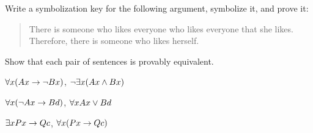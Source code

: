 \solutions
\problempart
\label{pr.likes}
Write a symbolization key for the following argument, symbolize it, and prove it:
\begin{quote}
There is someone who likes everyone who likes everyone that she likes. Therefore, there is someone who likes herself.
\end{quote}

\problempart
Show that each pair of sentences is provably equivalent.
\begin{earg}
\item $\forall x (Ax\rightarrow \neg Bx)$, $\neg\exists x(Ax \wedge Bx)$
\item $\forall x (\neg Ax\rightarrow Bd)$, $\forall x Ax \vee Bd$
\item $\exists x Px \rightarrow Qc$, $\forall x (Px \rightarrow Qc)$
\end{earg}


